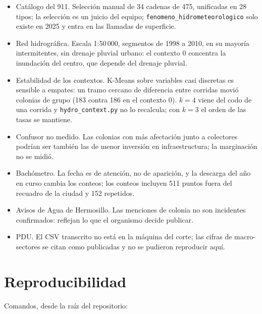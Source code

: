 \documentclass[11pt]{article}
\newcommand{\cod}[1]{\nolinkurl{#1}}
\begin{document}
\begin{itemize}
  \item Catálogo del 911. Selección manual de 34 cadenas de 475, unificadas en 28 tipos; la selección es un juicio del equipo; \cod{fenomeno_hidrometeorologico} solo existe en 2025 y entra en las llamadas de superficie.
  \item Red hidrográfica. Escala 1:50\,000, segmentos de 1998 a 2010, en su mayoría intermitentes, sin drenaje pluvial urbano: el contexto 0 concentra la inundación del centro, que depende del drenaje pluvial.
  \item Estabilidad de los contextos. K-Means sobre variables casi discretas es sensible a empates: un tramo cercano de diferencia entre corridas movió colonias de grupo (183 contra 186 en el contexto 0). $k=4$ viene del codo de una corrida y \cod{hydro_context.py} no lo recalcula; con $k=3$ el orden de las tasas se mantiene.
  \item Confusor no medido. Las colonias con más afectación junto a colectores podrían ser también las de menor inversión en infraestructura; la marginación no se midió.
  \item Bachómetro. La fecha es de atención, no de aparición, y la descarga del año en curso cambia los conteos; los conteos incluyen 511 puntos fuera del recuadro de la ciudad y 152 repetidos.
  \item Avisos de Agua de Hermosillo. Las menciones de colonia no son incidentes confirmados: reflejan lo que el organismo decide publicar.
  \item PDU. El CSV transcrito no está en la máquina del corte; las cifras de macro-sectores se citan como publicadas y no se pudieron reproducir aquí.
\end{itemize}

\section{Reproducibilidad}
\label{sec:repro}

Comandos, desde la raíz del repositorio:
\end{document}
